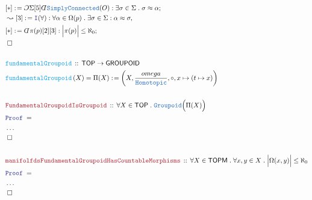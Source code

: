 \documentclass[12pt]{scrartcl}
\newcommand{\TYPE}[1]{\textcolor{NavyBlue}{\mathtt{#1}}}
\newcommand{\FUNC}[1]{\textcolor{Cerulean}{\mathtt{#1}}}
\newcommand{\LOGIC}[1]{\textcolor{Blue}{\mathtt{#1}}}
\newcommand{\THM}[1]{\textcolor{Maroon}{\mathtt{#1}}}
\renewcommand{\.}{\; . \;}
\newcommand{\de}{: \kern 0.1pc =}
\newcommand{\Act}[1]{\left( #1 \right)}
\newcommand{\Theorem}[2]{& \THM{#1} \, :: \, #2 \\ & \Proof = \\ }
\newcommand{\DeclareFunc}[2]{& \FUNC{#1} \, :: \, #2 \\}
\newcommand{\DefineNamedFunc}[4]{&  \FUNC{#1}\Act{#2} = #3 \de #4 \\}
\newcommand{\Page}[1]{ \begin{align*} #1 \end{align*}   }
\newcommand{ \bd }{ \ByDef }
\newcommand{\NoProof}{ & \ldots \\ \EndProof}
\newcommand{\Intro}{\LOGIC{I}}
\newcommand{\Conclude}[3]{& #1 \de #2 : #3; \\}
\newcommand{\Derive}[3]{& \leadsto #1 \de #2 : #3, \\}
\newcommand{\QED}{\; \square}
\newcommand{\EndProof}{& \QED \\}
\newcommand{\ByDef}{\rotatebox[origin=c]{-180}{$D$}}%
\newcommand{\ByConstr}{\rotatebox[origin=c]{-180}{$C$}}%
\newcommand{\Proof}{\LOGIC{Proof} \; }
\newcommand{\TOP}{\mathsf{TOP}}
\newcommand{\TOPM}{\mathsf{TOPM}}
\begin{document}
\Page{
	\Conclude{[*]}{\ByConstr \Sigma [5] \bd \TYPE{SimplyConnected}(O)}
	{
		\exists \sigma \in \Sigma \. \sigma \approx \alpha
	}
	\Derive{[3]}{\Intro(\forall)}{\forall \alpha \in \Omega(p) \. \exists \sigma \in \Sigma : \alpha \approx \sigma}
	\Conclude{[*]}{\bd \pi(p)[2][3]}{\Big|\pi(p)\Big| \le \aleph_0}
	\EndProof
	\\
	\DeclareFunc{fundamentalGroupoid}
	{
		\TOP \to \mathsf{GROUPOID}
	}
	\DefineNamedFunc{fundamentalGroupoid}{X}{\Pi(X)}{ 
		\left( X, \frac{omega}{\TYPE{Homotopic}},\circ,x \mapsto (t \mapsto x) \right)  
	}
	\\
	\Theorem{FundamentalGroupoidIsGroupoid}
	{
		\forall X \in \TOP \. \TYPE{Groupoid}\Big( \Pi(X) \Big)
	}
	\NoProof
	\\
	\Theorem{manifolfdsFundamentalGroupoidHasCountableMorphisms}
	{
		\forall X \in \TOPM \. \forall x,y \in X \.
		\Big|\Omega(x,y)\Big| \le \aleph_0
	}
	\NoProof
}
\newpage
\end{document}

